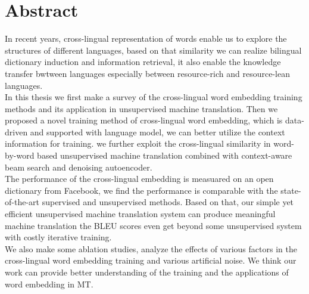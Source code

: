 \chapter{Abstract}
In recent years, cross-lingual representation of words enable us to explore the structures of different languages, based on that similarity we can realize bilingual dictionary induction and information retrieval, it also enable the knowledge transfer bwtween languages especially between resource-rich and resource-lean languages.\\
In this thesis we first make a survey of the cross-lingual word embedding training methods and its application in unsupervised machine translation. Then we proposed a novel training method of cross-lingual word embedding, which is data-driven and supported with language model, we can better utilize the context information for training. we further exploit the cross-lingual similarity in word-by-word based unsupervised machine translation combined with context-aware beam search and denoising autoencoder. \\
The performance of the cross-lingual embedding is measuared on an open dictionary from Facebook, we find the performance is comparable with the state-of-the-art supervised and unsupervised methods. Based on that, our simple yet efficient unsupervised machine translation system can produce meaningful machine translation the BLEU scores even get beyond some unsupervised system with costly iterative training. \\
We also make some ablation studies, analyze the effects of various factors in the cross-lingual word embedding training and various artificial noise. We think our work can provide better understanding of the training and the applications of word embedding in MT.